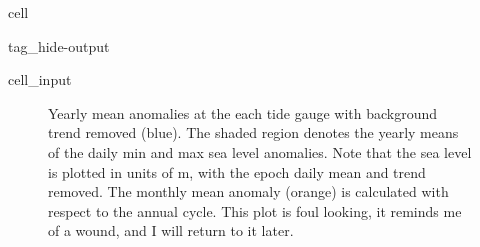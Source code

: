 \documentclass[letterpaper,10pt,english]{jupyterBook}
\begin{document}
\begin{sphinxuseclass}{cell}
\begin{sphinxuseclass}{tag_hide-output}
\begin{sphinxVerbatimInput}
\begin{sphinxuseclass}{cell_input}
\begin{sphinxVerbatim}[commandchars=\\\{\}]
    
   


    

\end{sphinxVerbatim}

\end{sphinxuseclass}\end{sphinxVerbatimInput}

\end{sphinxuseclass}
\end{sphinxuseclass}
\begin{figure}[htbp]
\centering
\capstart

\noindent{}
\caption{Yearly mean anomalies at the each tide gauge with background trend removed (blue). The shaded region denotes the yearly means of the daily min and max sea level anomalies. Note that the sea level is plotted in units of m, with the epoch daily mean and trend removed. The monthly mean anomaly (orange) is calculated with respect to the annual cycle. This plot is foul looking, it reminds me of a wound, and I will return to it later.}\label{\detokenize{notebooks/regional_and_local/SL_anomaly_annual:sl-mma-annual}}\end{figure}
\end{document}
